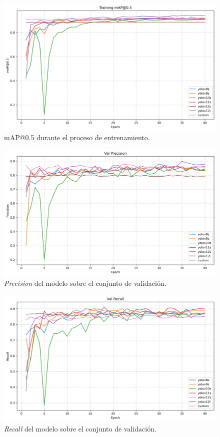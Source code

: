 \documentclass[12pt,a4paper,onecolumn,oneside]{report}
\begin{document}
\begin{figure}[H]
  \centering
  \includegraphics[width=1.0\textwidth]{figuras/YOLO_plots/map50.png}
  \caption{mAP@0.5 durante el proceso de entrenamiento.}
  \label{fig:yolo_train_map50}
\end{figure}

\begin{figure}[H]
  \centering
  \includegraphics[width=1.0\textwidth]{figuras/yolo_plots/precision.png}
  \caption{\textit{Precision} del modelo sobre el conjunto de validación.}
  \label{fig:yolo_train_precision}
\end{figure}

\begin{figure}[H]
  \centering
  \includegraphics[width=1.0\textwidth]{figuras/yolo_plots/recall.png}
  \caption{\textit{Recall} del modelo sobre el conjunto de validación.}
  \label{fig:yolo_train_recall}
\end{figure}
\end{document}
